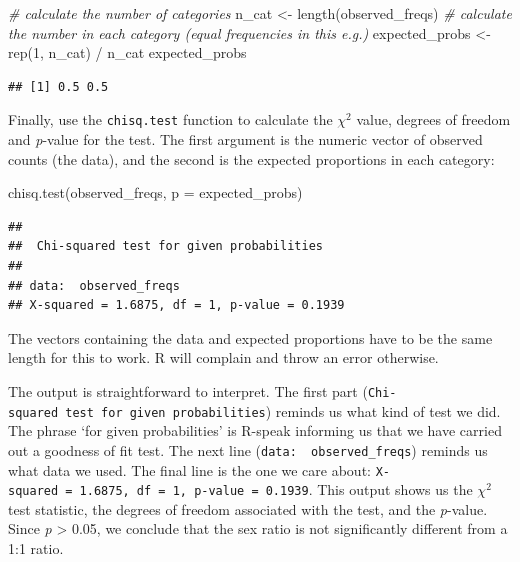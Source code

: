 \documentclass[
]{book}
\newenvironment{Shaded}{\begin{snugshade}}{\end{snugshade}}
\newcommand{\AttributeTok}[1]{\textcolor[rgb]{0.77,0.63,0.00}{#1}}
\newcommand{\CommentTok}[1]{\textcolor[rgb]{0.56,0.35,0.01}{\textit{#1}}}
\newcommand{\DecValTok}[1]{\textcolor[rgb]{0.00,0.00,0.81}{#1}}
\newcommand{\FunctionTok}[1]{\textcolor[rgb]{0.00,0.00,0.00}{#1}}
\newcommand{\NormalTok}[1]{#1}
\newcommand{\OtherTok}[1]{\textcolor[rgb]{0.56,0.35,0.01}{#1}}
\newcommand{\SpecialCharTok}[1]{\textcolor[rgb]{0.00,0.00,0.00}{#1}}
\begin{document}
\begin{Shaded}
\begin{Highlighting}[]
\CommentTok{\# calculate the number of categories}
\NormalTok{n\_cat }\OtherTok{\textless{}{-}} \FunctionTok{length}\NormalTok{(observed\_freqs)}
\CommentTok{\# calculate the number in each category (equal frequencies in this e.g.)}
\NormalTok{expected\_probs }\OtherTok{\textless{}{-}} \FunctionTok{rep}\NormalTok{(}\DecValTok{1}\NormalTok{, n\_cat) }\SpecialCharTok{/}\NormalTok{ n\_cat}
\NormalTok{expected\_probs}
\end{Highlighting}
\end{Shaded}

\begin{verbatim}
## [1] 0.5 0.5
\end{verbatim}

Finally, use the \texttt{chisq.test} function to calculate the \(\chi^{2}\) value, degrees of freedom and \emph{p}-value for the test. The first argument is the numeric vector of observed counts (the data), and the second is the expected proportions in each category:

\begin{Shaded}
\begin{Highlighting}[]
\FunctionTok{chisq.test}\NormalTok{(observed\_freqs, }\AttributeTok{p =}\NormalTok{ expected\_probs)}
\end{Highlighting}
\end{Shaded}

\begin{verbatim}
## 
##  Chi-squared test for given probabilities
## 
## data:  observed_freqs
## X-squared = 1.6875, df = 1, p-value = 0.1939
\end{verbatim}

The vectors containing the data and expected proportions have to be the same length for this to work. R will complain and throw an error otherwise.

The output is straightforward to interpret. The first part (\texttt{Chi-squared\ test\ for\ given\ probabilities}) reminds us what kind of test we did. The phrase `for given probabilities' is R-speak informing us that we have carried out a goodness of fit test. The next line (\texttt{data:\ \ observed\_freqs}) reminds us what data we used. The final line is the one we care about: \texttt{X-squared\ =\ 1.6875,\ df\ =\ 1,\ p-value\ =\ 0.1939}. This output shows us the \(\chi^{2}\) test statistic, the degrees of freedom associated with the test, and the \emph{p}-value. Since \emph{p} \textgreater{} 0.05, we conclude that the sex ratio is not significantly different from a 1:1 ratio.
\end{document}

